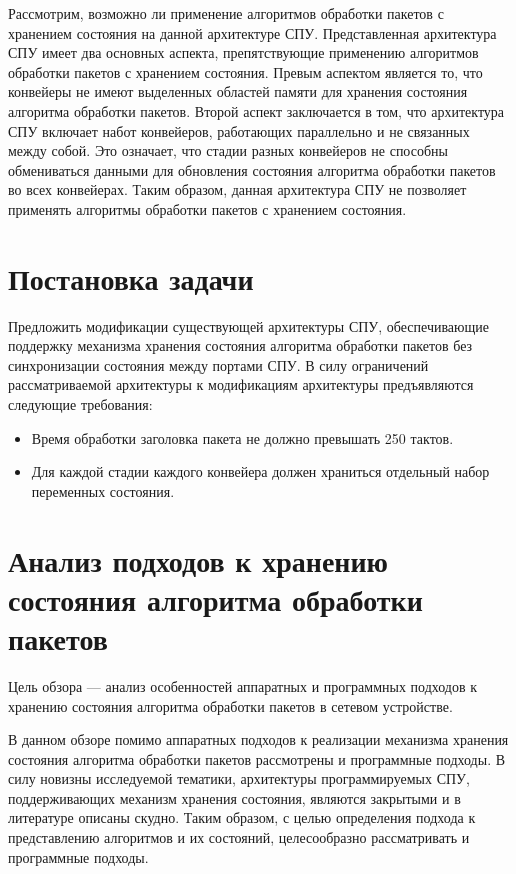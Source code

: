 \documentclass[conference]{IEEEtran}
\begin{document}
Рассмотрим, возможно ли применение алгоритмов обработки пакетов с хранением
состояния на данной архитектуре СПУ. Представленная
архитектура СПУ имеет два основных аспекта, препятствующие применению
алгоритмов обработки пакетов с хранением состояния. Превым аспектом является
то, что конвейеры не имеют выделенных областей памяти для хранения
состояния алгоритма обработки пакетов. Второй аспект заключается в том,
что архитектура СПУ включает набот конвейеров, работающих
параллельно и не связанных между собой. Это означает, что стадии разных
конвейеров не способны обмениваться данными для обновления состояния
алгоритма обработки пакетов во всех конвейерах.
Таким образом, данная архитектура СПУ не позволяет применять алгоритмы
обработки пакетов с хранением состояния.

\section{Постановка задачи}
Предложить модификации существующей архитектуры СПУ, обеспечивающие поддержку
механизма хранения состояния алгоритма обработки пакетов без синхронизации
состояния между портами СПУ. В силу ограничений рассматриваемой архитектуры
к модификациям архитектуры предъявляются следующие требования:
\begin{itemize}
	\item Время обработки заголовка пакета не должно превышать 250 тактов.
	\item Для каждой стадии каждого конвейера должен храниться отдельный
		набор переменных состояния.
\end{itemize}

\section{Анализ подходов к хранению состояния алгоритма обработки пакетов}
Цель обзора --- анализ особенностей аппаратных и программных подходов к
хранению состояния алгоритма обработки пакетов в сетевом устройстве.

В данном обзоре помимо аппаратных подходов к реализации механизма
хранения состояния алгоритма обработки пакетов рассмотрены и программные
подходы. В силу новизны исследуемой
тематики, архитектуры программируемых СПУ, поддерживающих механизм
хранения состояния, являются закрытыми и в литературе описаны скудно.
Таким образом, с целью определения подхода к представлению алгоритмов
и их состояний, целесообразно рассматривать и программные подходы.
\end{document}
